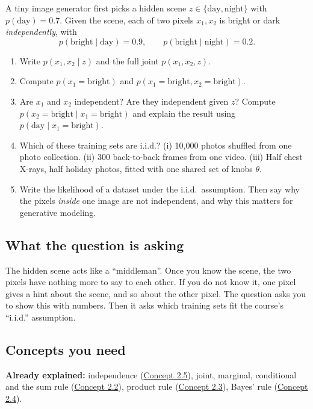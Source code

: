 \documentclass[12pt,a4paper]{article}
\begin{document}
A tiny image generator first picks a hidden scene $z\in\{\text{day},\text{night}\}$ with $p(\text{day})=0.7$. Given the scene, each of two pixels $x_1,x_2$ is bright or dark \emph{independently}, with
\[
p(\text{bright}\mid\text{day})=0.9,\qquad p(\text{bright}\mid\text{night})=0.2 .
\]
\begin{enumerate}[label=(\alph*)]
  \item Write $p(x_1,x_2\mid z)$ and the full joint $p(x_1,x_2,z)$.
  \item[\colorbox{yellow}{(b)}] Compute $p(x_1=\text{bright})$ and $p(x_1=\text{bright},x_2=\text{bright})$.
  \item[\colorbox{yellow}{(c)}] Are $x_1$ and $x_2$ independent? Are they independent given $z$? Compute $p(x_2=\text{bright}\mid x_1=\text{bright})$ and explain the result using $p(\text{day}\mid x_1=\text{bright})$.
  \item Which of these training sets are i.i.d.? (i) 10,000 photos shuffled from one photo collection. (ii) 300 back-to-back frames from one video. (iii) Half chest X-rays, half holiday photos, fitted with one shared set of knobs $\theta$.
  \item[\colorbox{yellow}{(e)}] Write the likelihood of a dataset under the i.i.d.\ assumption. Then say why the pixels \emph{inside} one image are not independent, and why this matters for generative modeling.
\end{enumerate}

\subsection{What the question is asking}

The hidden scene acts like a ``middleman''. Once you know the scene, the two pixels have nothing more to say to each other. If you do not know it, one pixel gives a hint about the scene, and so about the other pixel. The question asks you to show this with numbers. Then it asks which training sets fit the course's ``i.i.d.'' assumption.

\subsection{Concepts you need}

\textbf{Already explained:} independence (\hyperref[c2-5]{Concept 2.5}), joint, marginal, conditional and the sum rule (\hyperref[c2-2]{Concept 2.2}), product rule (\hyperref[c2-3]{Concept 2.3}), Bayes' rule (\hyperref[c2-4]{Concept 2.4}).
\end{document}

